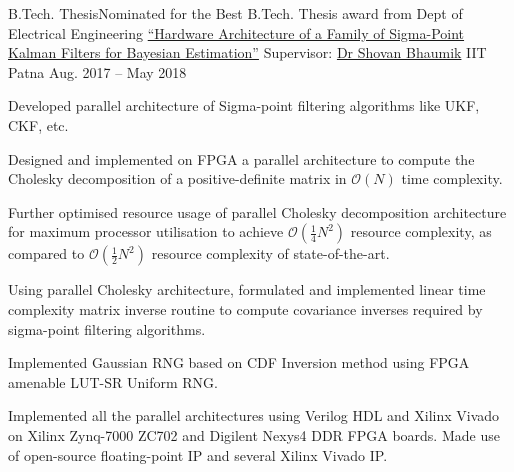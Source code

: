 \begin{cvexperience}
\cvposition
	{B.Tech. Thesis\quad\textbar\quad Nominated for the Best B.Tech. Thesis award from Dept of Electrical Engineering} %
	{\href{https://github.com/haitmak/sigma}{``Hardware Architecture of a Family of Sigma-Point Kalman Filters for Bayesian Estimation''}} %
	{Supervisor: \href{http://www.tutorialpoint.org/ShovanBhaumik/index.html}{Dr Shovan Bhaumik}} %
	{IIT Patna} %
	{Aug. 2017 -- May 2018} %
	{\begin{cvitems} %
		\item {Developed parallel architecture of Sigma-point filtering algorithms like UKF, CKF, etc.}
		\item {Designed and implemented on FPGA a parallel architecture to compute the Cholesky decomposition of a positive-definite matrix in $\mathcal{O} \left( N \right)$ time complexity.}
		\item {Further optimised resource usage of parallel Cholesky decomposition architecture for maximum processor utilisation to achieve $\mathcal{O} \left( \frac{1}{4} N^2 \right)$ resource complexity, as compared to $\mathcal{O} \left( \frac{1}{2} N^2 \right)$ resource complexity of state-of-the-art.}
		\item {Using parallel Cholesky architecture, formulated and implemented linear time complexity matrix inverse routine to compute covariance inverses required by sigma-point filtering algorithms.}
		\item {Implemented Gaussian RNG based on CDF Inversion method using FPGA amenable LUT-SR Uniform RNG.}
		\item {Implemented all the parallel architectures using Verilog HDL and Xilinx Vivado on Xilinx Zynq-7000 ZC702 and Digilent Nexys4 DDR FPGA boards. Made use of open-source floating-point IP and several Xilinx Vivado IP.}
	\end{cvitems}}


\end{cvexperience}
